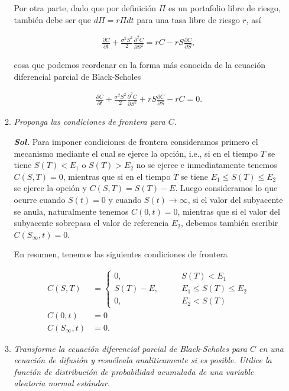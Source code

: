 \documentclass[letter]{article}
\begin{document}
\begin{enumerate}
\begin{enumerate}[label=\alph*)]
Por otra parte, dado que por definición $\Pi$ es un portafolio libre de riesgo, también debe ser que $d\Pi = r\Pi dt$ para una tasa libre de riesgo $r$, así

\begin{align*}
    \frac{\partial C}{\partial t} + \frac{\sigma^2S^2}{2}\frac{\partial^2C}{\partial S^2} = rC - rS\frac{\partial C}{\partial S},
\end{align*}

cosa que podemos reordenar en la forma más conocida de la ecuación diferencial parcial de Black-Scholes

\begin{align*}
    \frac{\partial C}{\partial t} + \frac{\sigma^2S^2}{2}\frac{\partial^2C}{\partial S^2} + rS\frac{\partial C}{\partial S} - rC = 0.
\end{align*}

\item \emph{Proponga las condiciones de frontera para $C$.}

\medskip

\textbf{\textit{Sol.}} Para imponer condiciones de frontera consideramos primero el mecanismo mediante el cual se ejerce la opción, i.e., si en el tiempo $T$ se tiene $S(T) < E_1$ o $S(T) > E_2$ no se ejerce e inmediatamente tenemos $C(S,T) = 0$, mientras que si en el tiempo $T$ se tiene $E_1 \leq S(T) \leq E_2$ se ejerce la opción y $C(S,T) = S(T) - E$. Luego consideramos lo que ocurre cuando $S(t) = 0$ y cuando $S(t) \to \infty$, si el valor del subyacente se anula, naturalmente tenemos $C(0,t) = 0$, mientras que si el valor del subyacente sobrepasa el valor de referencia $E_2$, debemos también escribir $C(S_\infty,t) = 0$.

En resumen, tenemos las siguientes condiciones de frontera

\begin{align*}
    C(S,T) &= \begin{cases}
                0, &\qquad S(T) < E_1\\
                S(T) - E, &\qquad E_1 \leq S(T) \leq E_2\\
                0, &\qquad E_2 < S(T)
              \end{cases}\\
    C(0,t) &= 0\\
    C(S_\infty,t) &= 0.
\end{align*}

\item \emph{Transforme la ecuación diferencial parcial de Black-Scholes para $C$ en una ecuación de difusión y resuélvala analíticamente si es posible. Utilice la función de distribución de probabilidad acumulada de una variable aleatoria normal estándar.}


\end{enumerate}
\end{enumerate}
\end{document}
